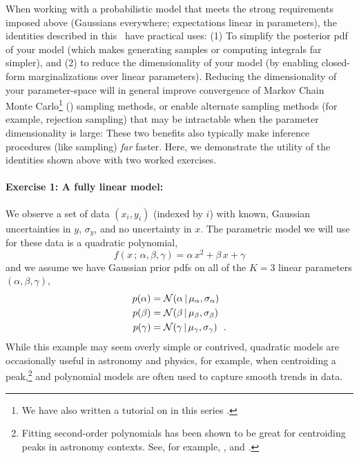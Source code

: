 When working with a probabilistic model that meets the strong requirements
imposed above (Gaussians everywhere; expectations linear in parameters),
the identities described in this
\documentname\ have practical uses: (1) To simplify the posterior pdf of your
model (which makes generating samples or computing integrals far simpler), and
(2) to reduce the dimensionality of your model (by enabling closed-form
marginalizations over linear parameters).
Reducing the dimensionality of your parameter-space will in general improve
convergence of Markov Chain Monte Carlo\footnote{We have also written a tutorial
on  in this series \citep{Hogg:2018}.} () sampling
methods, or enable alternate sampling methods (for example, rejection sampling)
that may be intractable when the parameter dimensionality is large: These two
benefits also typically make inference procedures (like sampling) \emph{far}
faster.
Here, we demonstrate the utility of the identities shown above with two
worked exercises.


\paragraph{Exercise 1: A fully linear model:} We observe
a set of data $(x_i, y_i)$ (indexed by $i$) with
known, Gaussian uncertainties in $y$, $\sigma_y$, and no uncertainty in $x$.
The parametric model we will use for these data is a quadratic polynomial,
\begin{equation}
  f(x \,;\, \alpha, \beta, \gamma) = \alpha\,x^2 + \beta\,x + \gamma
\end{equation}
and we assume we have Gaussian prior pdfs on all of the $K=3$ linear parameters
$(\alpha, \beta, \gamma)$,
\begin{align}
  p(\alpha) &= \mathcal{N}\!\,(\alpha \,|\, \mu_\alpha, \sigma_\alpha)\\
  p(\beta) &= \mathcal{N}\!\,(\beta \,|\, \mu_\beta, \sigma_\beta)\\
  p(\gamma) &= \mathcal{N}\!\,(\gamma \,|\, \mu_\gamma, \sigma_\gamma)
  ~~.
\end{align}
While this example may seem overly simple or contrived, quadratic models are
occasionally useful in astronomy and physics, for example, when centroiding a
peak,\footnote{Fitting second-order polynomials has been shown to be great for
  centroiding peaks in astronomy contexts. See, for example, \cite{vakili}, and
  \cite{teague}.}
and polynomial models are often used to capture smooth trends in
data.


